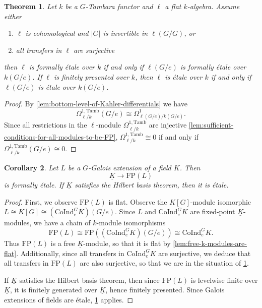 \documentclass[11pt,dvipsnames]{amsart}
\newtheorem{theorem}{Theorem}[section]
\newtheorem{corollary}[theorem]{Corollary}
\theoremstyle{BoldRemark}
\newcommand{\Coind}{\mathrm{CoInd}}
\newcommand{\FP}{\mathrm{FP}}
\newcommand{\Tamb}{\mathrm{Tamb}}
\begin{document}
\begin{theorem}\label{thm:detecting-etale-at-bottom-level}
	Let $k$ be a $G$-Tambara functor and $\ell$ a flat $k$-algebra. Assume either
	\begin{enumerate}
		\item $\ell$ is cohomological and $|G|$ is invertible in $\ell(G/G)$, or
		\item all transfers in $\ell$ are surjective
	\end{enumerate}
	then $\ell$ is formally \'{e}tale over $k$ if and only if $\ell(G/e)$ is formally \'{e}tale over $k(G/e)$. If $\ell$ is finitely presented over $k$, then $\ell$ is \'{e}tale over $k$ if and only if $\ell(G/e)$ is \'{e}tale over $k(G/e)$.
\end{theorem}

\begin{proof}
	By \cref{lem:bottom-level-of-Kahler-differentials} we have 
    \[ 
        \Omega^{1,\Tamb}_{\ell/k}(G/e) \cong \Omega^1_{\ell(G/e)/k(G/e)} .
    \] 
    Since all restrictions in the $\ell$-module $\Omega^{1,\Tamb}_{\ell/k}$ are injective \cref{lem:sufficient-conditions-for-all-modules-to-be-FP}, $\Omega^{1,\Tamb}_{\ell/k} \cong 0$ if and only if $\Omega^{1,\Tamb}_{\ell/k}(G/e) \cong 0$.
\end{proof}

\begin{corollary}\label{cor:Galois-field-extension-gives-etale}
    Let $L$ be a $G$-Galois extension of a field $K$. Then 
    \[ 
        \underline{K} \rightarrow \FP(L) 
    \] 
    is formally \'{e}tale. If $\underline{K}$ satisfies the Hilbert basis theorem, then it is \'{e}tale.
\end{corollary}

\begin{proof}
    First, we observe $\FP(L)$ is flat. Observe the $K[G]$-module isomorphic $L \cong K[G] \cong (\Coind_e^G K)(G/e)$. Since $L$ and $\Coind_e^G K$ are fixed-point $\underline{K}$-modules, we have a chain of $k$-module isomorphisms 
    \[ 
        \FP(L) \cong \FP((\Coind_e^G K)(G/e)) \cong \Coind_e^G K . 
    \] 
    Thus $\FP(L)$ is a free $\underline{K}$-module, so that it is flat by \cref{lem:free-k-modules-are-flat}. Additionally, since all transfers in $\Coind_e^G K$ are surjective, we deduce that all transfers in $\FP(L)$ are also surjective, so that we are in the situation of \cref{thm:detecting-etale-at-bottom-level}.
    
    If $\underline{K}$ satisfies the Hilbert basis theorem, then since $\FP(L)$ is levelwise finite over $\underline{K}$, it is finitely generated over $\underline{K}$, hence finitely presented. Since Galois extensions of fields are \'{e}tale, \cref{thm:detecting-etale-at-bottom-level} applies.
\end{proof}
\end{document}
